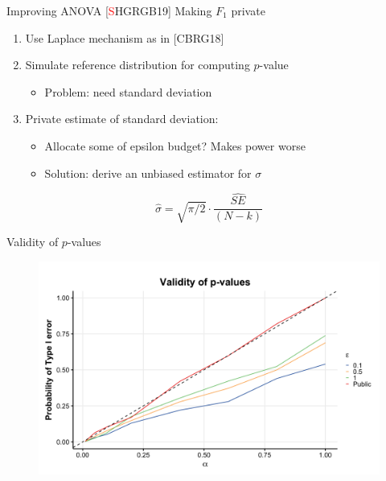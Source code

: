 \documentclass{beamer}
\begin{document}
\begin{frame}{Improving ANOVA [\textcolor{red}{S}HGRGB19]}
Making $F_1$ private \pause
\begin{enumerate}
    \item Use Laplace mechanism as in [CBRG18] \pause
    \item Simulate reference distribution for computing $p$-value
    \begin{itemize}
        \item Problem: need standard deviation \pause
    \end{itemize}
    \item Private estimate of standard deviation:  
    \begin{itemize}
        \item Allocate some of epsilon budget? \pause Makes power worse \pause
        \item Solution: derive an unbiased estimator for $\sigma$ \pause
    \end{itemize}
\end{enumerate}
\bigskip

$$\hat{\sigma} = \sqrt{\pi/2} \cdot \frac{\widehat{SE}}{(N-k)} $$
\end{frame}

\begin{frame}{Validity of $p$-values}
    \begin{figure}
  \includegraphics[scale=0.1]{images/valid-pvals}
  \end{figure}
\end{frame}
\end{document}
